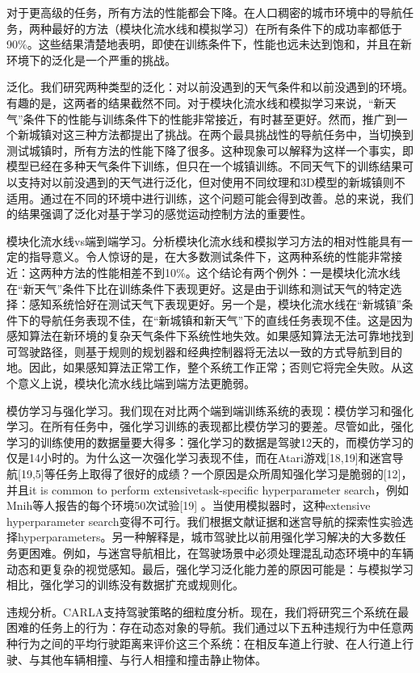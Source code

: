 对于更高级的任务，所有方法的性能都会下降。在人口稠密的城市环境中的导航任务，两种最好的方法（模块化流水线和模拟学习）在所有条件下的成功率都低于90\%。这些结果清楚地表明，即使在训练条件下，性能也远未达到饱和，并且在新环境下的泛化是一个严重的挑战。

泛化。我们研究两种类型的泛化：对以前没遇到的天气条件和以前没遇到的环境。有趣的是，这两者的结果截然不同。对于模块化流水线和模拟学习来说，“新天气”条件下的性能与训练条件下的性能非常接近，有时甚至更好。然而，推广到一个新城镇对这三种方法都提出了挑战。在两个最具挑战性的导航任务中，当切换到测试城镇时，所有方法的性能下降了很多。这种现象可以解释为这样一个事实，即模型已经在多种天气条件下训练，但只在一个城镇训练。不同天气下的训练结果可以支持对以前没遇到的天气进行泛化，但对使用不同纹理和3D模型的新城镇则不适用。通过在不同的环境中进行训练，这个问题可能会得到改善。总的来说，我们的结果强调了泛化对基于学习的感觉运动控制方法的重要性。

模块化流水线vs端到端学习。分析模块化流水线和模拟学习方法的相对性能具有一定的指导意义。令人惊讶的是，在大多数测试条件下，这两种系统的性能非常接近：这两种方法的性能相差不到10\%。这个结论有两个例外：一是模块化流水线在“新天气”条件下比在训练条件下表现更好。这是由于训练和测试天气的特定选择：感知系统恰好在测试天气下表现更好。另一个是，模块化流水线在“新城镇”条件下的导航任务表现不佳，在“新城镇和新天气”下的直线任务表现不佳。这是因为感知算法在新环境的复杂天气条件下系统性地失效。如果感知算法无法可靠地找到可驾驶路径，则基于规则的规划器和经典控制器将无法以一致的方式导航到目的地。因此，如果感知算法正常工作，整个系统工作正常；否则它将完全失败。从这个意义上说，模块化流水线比端到端方法更脆弱。

模仿学习与强化学习。我们现在对比两个端到端训练系统的表现：模仿学习和强化学习。在所有任务中，强化学习训练的表现都比模仿学习的要差。尽管如此，强化学习的训练使用的数据量要大得多：强化学习的数据是驾驶12天的，而模仿学习的仅是14小时的。为什么这一次强化学习表现不佳，而在Atari游戏[18,19]和迷宫导航[19,5]等任务上取得了很好的成绩？一个原因是众所周知强化学习是脆弱的[12]，并且it is common to perform extensivetask-specific hyperparameter search，例如Mnih等人报告的每个环境50次试验[19] 。当使用模拟器时，这种extensive hyperparameter search变得不可行。我们根据文献证据和迷宫导航的探索性实验选择hyperparameters。另一种解释是，城市驾驶比以前用强化学习解决的大多数任务更困难。例如，与迷宫导航相比，在驾驶场景中必须处理混乱动态环境中的车辆动态和更复杂的视觉感知。最后，强化学习泛化能力差的原因可能是：与模拟学习相比，强化学习的训练没有数据扩充或规则化。

违规分析。CARLA支持驾驶策略的细粒度分析。现在，我们将研究三个系统在最困难的任务上的行为：存在动态对象的导航。我们通过以下五种违规行为中任意两种行为之间的平均行驶距离来评价这三个系统：在相反车道上行驶、在人行道上行驶、与其他车辆相撞、与行人相撞和撞击静止物体。


